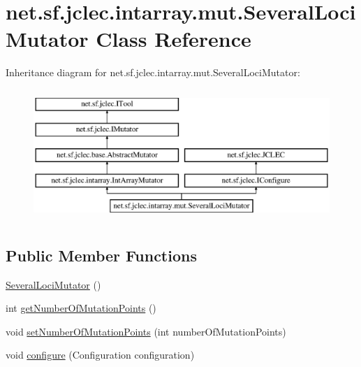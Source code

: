 \hypertarget{classnet_1_1sf_1_1jclec_1_1intarray_1_1mut_1_1_several_loci_mutator}{\section{net.\-sf.\-jclec.\-intarray.\-mut.\-Several\-Loci\-Mutator Class Reference}
\label{classnet_1_1sf_1_1jclec_1_1intarray_1_1mut_1_1_several_loci_mutator}
}
Inheritance diagram for net.\-sf.\-jclec.\-intarray.\-mut.\-Several\-Loci\-Mutator\-:\begin{figure}[H]
\begin{center}
\leavevmode
\includegraphics[height=5.000000cm]{classnet_1_1sf_1_1jclec_1_1intarray_1_1mut_1_1_several_loci_mutator}
\end{center}
\end{figure}
\subsection*{Public Member Functions}
\begin{DoxyCompactItemize}
\item 
\hyperlink{classnet_1_1sf_1_1jclec_1_1intarray_1_1mut_1_1_several_loci_mutator_a403ef61ec0b95a003a777a68bc28e3d1}{Several\-Loci\-Mutator} ()
\item 
int \hyperlink{classnet_1_1sf_1_1jclec_1_1intarray_1_1mut_1_1_several_loci_mutator_a2c9c3c2140acfa482a8755768be7f661}{get\-Number\-Of\-Mutation\-Points} ()
\item 
void \hyperlink{classnet_1_1sf_1_1jclec_1_1intarray_1_1mut_1_1_several_loci_mutator_a86ed83d036fa619d12844eba3ad7bc90}{set\-Number\-Of\-Mutation\-Points} (int number\-Of\-Mutation\-Points)
\item 
void \hyperlink{classnet_1_1sf_1_1jclec_1_1intarray_1_1mut_1_1_several_loci_mutator_ad0028627de8f267fb3be9f9f44eee4e9}{configure} (Configuration configuration)
\end{DoxyCompactItemize}

